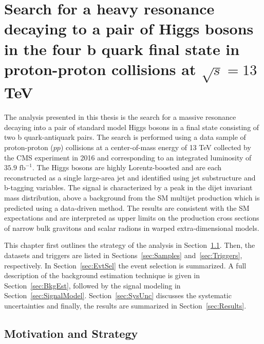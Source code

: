 \chapter{Search for a heavy resonance decaying to a pair of Higgs bosons in the four b quark final state in proton-proton collisions at $\sqrt{s}=13$ TeV}
\label{ch:Analysis}

The analysis presented in this thesis is the search for a massive resonance decaying into a pair of standard model Higgs bosons in a final state consisting of two b quark-antiquark pairs. The search is performed using a data sample of proton-proton ($pp$) collisions at a center-of-mass energy of 13 TeV collected by the CMS experiment in 2016 and corresponding to an integrated luminosity of $35.9$ $\mathrm{fb}^{-1}$. The Higgs bosons are highly Lorentz-boosted and are each reconstructed as a single large-area jet and identified using jet substructure and b-tagging variables. The signal is characterized by a peak in the dijet invariant mass distribution, above a background from the SM multijet production which is predicted using a data-driven method. The results are consistent with the SM expectations and are interpreted as upper limits on the production cross sections of narrow bulk gravitons and scalar radions in warped extra-dimensional models. 

This chapter first outlines the strategy of the analysis in Section~\ref{sec:Strat}. Then, the datasets and triggers are listed in Sections~\ref{sec:Samples} and~\ref{sec:Triggers}, respectively. In Section~\ref{sec:EvtSel} the event selection is summarized. A full description of the background estimation technique is given in Section~\ref{sec:BkgEst}, followed by the signal modeling in Section~\ref{sec:SignalModel}. Section~\ref{sec:SysUnc} discusses the systematic uncertainties and finally, the results are summarized in Section~\ref{sec:Results}.

\section{Motivation and Strategy}
\label{sec:Strat}


